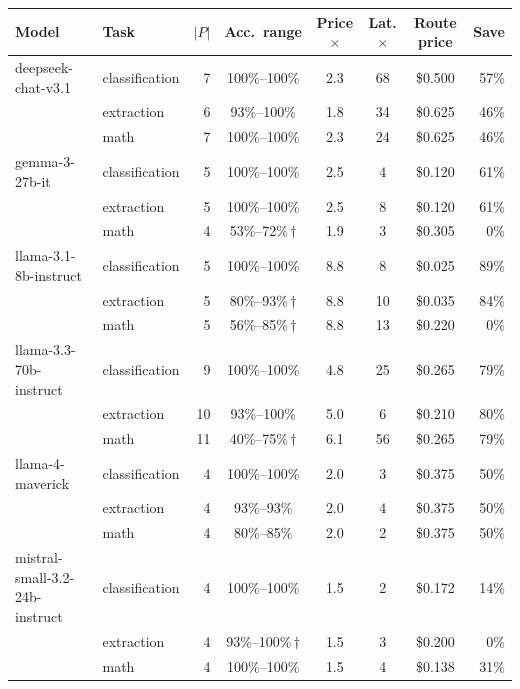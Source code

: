 \begin{tabular}{llrccccr}
\toprule
Model & Task & $|P|$ & Acc.\ range & Price$\times$ & Lat.$\times$ & Route price & Save \\
\midrule
deepseek-chat-v3.1 & classification & 7 & 100\%--100\% & 2.3 & 68 & \$0.500 & 57\% \\
 & extraction & 6 & 93\%--100\% & 1.8 & 34 & \$0.625 & 46\% \\
 & math & 7 & 100\%--100\% & 2.3 & 24 & \$0.625 & 46\% \\
gemma-3-27b-it & classification & 5 & 100\%--100\% & 2.5 & 4 & \$0.120 & 61\% \\
 & extraction & 5 & 100\%--100\% & 2.5 & 8 & \$0.120 & 61\% \\
 & math & 4 & 53\%--72\%\,$\dagger$ & 1.9 & 3 & \$0.305 & 0\% \\
llama-3.1-8b-instruct & classification & 5 & 100\%--100\% & 8.8 & 8 & \$0.025 & 89\% \\
 & extraction & 5 & 80\%--93\%\,$\dagger$ & 8.8 & 10 & \$0.035 & 84\% \\
 & math & 5 & 56\%--85\%\,$\dagger$ & 8.8 & 13 & \$0.220 & 0\% \\
llama-3.3-70b-instruct & classification & 9 & 100\%--100\% & 4.8 & 25 & \$0.265 & 79\% \\
 & extraction & 10 & 93\%--100\% & 5.0 & 6 & \$0.210 & 80\% \\
 & math & 11 & 40\%--75\%\,$\dagger$ & 6.1 & 56 & \$0.265 & 79\% \\
llama-4-maverick & classification & 4 & 100\%--100\% & 2.0 & 3 & \$0.375 & 50\% \\
 & extraction & 4 & 93\%--93\% & 2.0 & 4 & \$0.375 & 50\% \\
 & math & 4 & 80\%--85\% & 2.0 & 2 & \$0.375 & 50\% \\
mistral-small-3.2-24b-instruct & classification & 4 & 100\%--100\% & 1.5 & 2 & \$0.172 & 14\% \\
 & extraction & 4 & 93\%--100\%\,$\dagger$ & 1.5 & 3 & \$0.200 & 0\% \\
 & math & 4 & 100\%--100\% & 1.5 & 4 & \$0.138 & 31\% \\
\bottomrule
\end{tabular}
